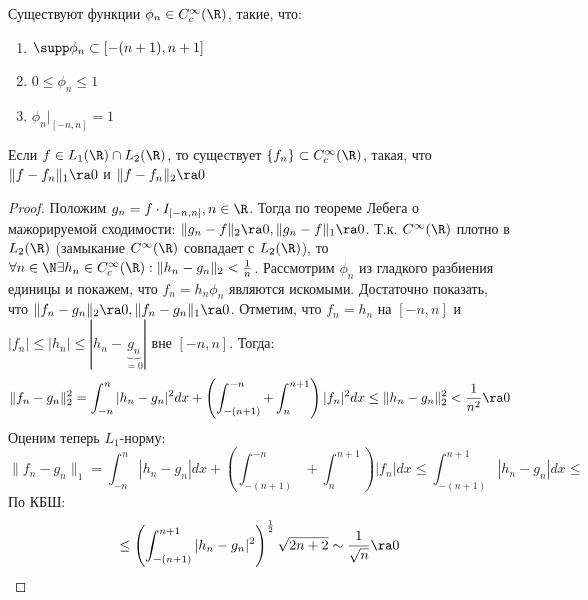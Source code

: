 \begin{reminder}
    Существуют функции \(\phi_n \in C_c^\infty(\R)\), такие, что:
    \begin{enumerate}
        \item \(\supp \phi_n \subset [-(n + 1), n + 1]\)
        \item \(0 \le \phi_n \le 1\)
        \item \(\phi_n|_{[-n, n]} = 1\)
    \end{enumerate}
\end{reminder}

\begin{lemma}
    Если \(f \in L_1(\R) \cap L_2(\R)\), то существует \(\{f_n\} \subset C_c^\infty(\R)\), такая, что \(\|f - f_n\|_1 \ra 0\) и \(\|f - f_n\|_2 \ra 0\)
\end{lemma}
\begin{proof}
    Положим \(g_n = f \cdot I_{[-n, n]}, n \in \R\). Тогда по теореме Лебега о мажорируемой сходимости: \(\|g_n - f\|_2 \ra 0, \|g_n - f\|_1 \ra 0\). Т.к. \(C^\infty(\R)\) плотно в \(L_2(\R)\) (замыкание \(C^\infty(\R)\) совпадает с \(L_2(\R)\)), то \(\forall n \in \N \exists h_n \in C^\infty_c(\R): \|h_n - g_n\|_2 < \frac{1}{n}\). Рассмотрим \(\phi_n\) из гладкого разбиения единицы и покажем, что \(f_n = h_n\phi_n\) являются искомыми. Достаточно показать, что \(\|f_n - g_n\|_2 \ra 0, \|f_n - g_n\|_1 \ra 0\). Отметим, что \(f_n = h_n\) на \([-n, n]\) и \(|f_n| \le |h_n| \le |h_n - \underbrace{g_n}_{=0}|\) вне \([-n, n]\). Тогда:
    \[\|f_n - g_n\|_2^2 = \int_{-n}^n|h_n - g_n|^2dx + \left( \int_{-(n + 1)}^{-n} + \int_{n}^{n + 1} \right)|f_n|^2dx \le \|h_n - g_n\|^2_2 < \frac{1}{n^2} \ra 0\]
    Оценим теперь \(L_1\)-норму:
    \[\|f_n - g_n\|_1 = \int_{-n}^n|h_n - g_n|dx + \left( \int_{-(n + 1)}^{-n} + \int_{n}^{n + 1} \right)|f_n|dx \le \int_{-(n + 1)}^{n + 1}|h_n - g_n|dx \le\]
    По КБШ:
    \[\le \left( \int_{-(n + 1)}^{n + 1} |h_n - g_n|^2 \right)^{\frac{1}{2}}\sqrt{2n + 2} \sim \frac{1}{\sqrt{n}} \ra 0\]
\end{proof}

